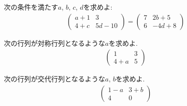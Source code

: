 \begin{quiz}
  次の条件を満たす$a$, $b$, $c$, $d$を求めよ:
  \begin{align*}
    \begin{pmatrix}
      a+1& 3\\
      4+c &5d-10
    \end{pmatrix}
    =
    \begin{pmatrix}
      7& 2b+5\\
      6 &-4d+8
    \end{pmatrix}
  \end{align*}
\end{quiz}


\begin{quiz}
  次の行列が対称行列となるような$a$を求めよ.
  \begin{align*}
    \begin{pmatrix}
      1& 3\\
      4+a &5
    \end{pmatrix}
  \end{align*}
\end{quiz}

\begin{quiz}
  次の行列が交代行列となるような$a$, $b$を求めよ.
  \begin{align*}
    \begin{pmatrix}
      1-a& 3+b\\
      4  &0
    \end{pmatrix}
  \end{align*}
\end{quiz}


